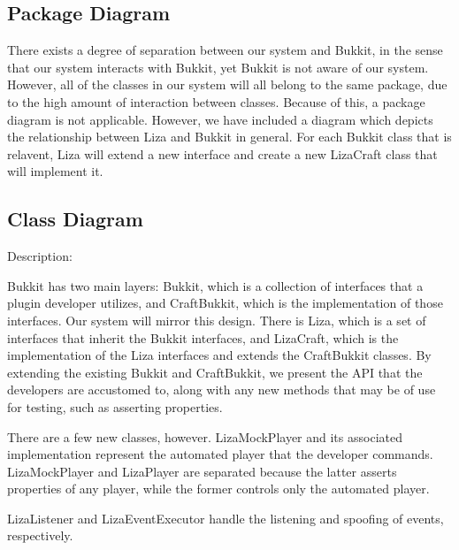 \documentclass{article}
\begin{document}
\subsection{Package Diagram}

There exists a degree of separation between our system and Bukkit, in the
sense that our system interacts with Bukkit, yet Bukkit is not aware of our
system. However, all of the classes in our system will all belong to the same
package, due to the high amount of interaction between classes. Because
of this, a package diagram is not applicable.  However, we have included a 
diagram which depicts the relationship between Liza and Bukkit in general.
For each Bukkit class that is relavent, Liza will extend a new interface and 
create a new LizaCraft class that will implement it. \newline 



\subsection{Class Diagram}

Description:
\newline

\noindent
Bukkit has two main layers: Bukkit, which is a collection of interfaces that
a plugin developer utilizes, and CraftBukkit, which is the implementation
of those interfaces. Our system will mirror this design. There is Liza, which
is a set of interfaces that inherit the Bukkit interfaces, and LizaCraft, which
is the implementation of the Liza interfaces and extends the CraftBukkit classes.
By extending the existing Bukkit and CraftBukkit, we present the API that
the developers are accustomed to, along with any new methods that may
be of use for testing, such as asserting properties. 
\newline

\noindent
There are a few new classes, however. LizaMockPlayer and its associated
implementation represent the automated player that the developer
commands. LizaMockPlayer and LizaPlayer are separated because the
latter asserts properties of any player, while the former controls only
the automated player.
\newline

\noindent
LizaListener and LizaEventExecutor handle the listening and spoofing of
events, respectively. 
\newline
\end{document}
